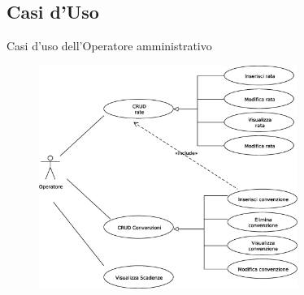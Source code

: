   \subsection{Casi d'Uso}
  \begin{frame}{Casi d'uso dell'Operatore amministrativo}
    \begin{figure}[h]
    \label{use_case_diag_operator}
    \centering
    \includegraphics[height=0.85\textheight, width=0.75\textwidth]{images/casi_uso_operatore_semplified.eps}
    \end{figure}
  \end{frame}
  
